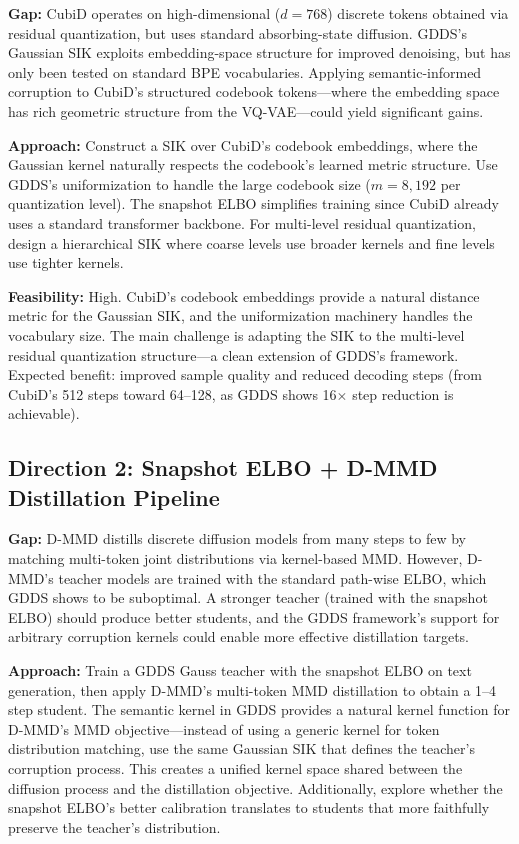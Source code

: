 \documentclass[11pt]{article}
\begin{document}
\textbf{Gap:} CubiD operates on high-dimensional ($d=768$) discrete tokens obtained via residual quantization, but uses standard absorbing-state diffusion. GDDS's Gaussian SIK exploits embedding-space structure for improved denoising, but has only been tested on standard BPE vocabularies. Applying semantic-informed corruption to CubiD's structured codebook tokens---where the embedding space has rich geometric structure from the VQ-VAE---could yield significant gains.

\textbf{Approach:} Construct a SIK over CubiD's codebook embeddings, where the Gaussian kernel naturally respects the codebook's learned metric structure. Use GDDS's uniformization to handle the large codebook size ($m = 8{,}192$ per quantization level). The snapshot ELBO simplifies training since CubiD already uses a standard transformer backbone. For multi-level residual quantization, design a hierarchical SIK where coarse levels use broader kernels and fine levels use tighter kernels.

\textbf{Feasibility:} High. CubiD's codebook embeddings provide a natural distance metric for the Gaussian SIK, and the uniformization machinery handles the vocabulary size. The main challenge is adapting the SIK to the multi-level residual quantization structure---a clean extension of GDDS's framework. Expected benefit: improved sample quality and reduced decoding steps (from CubiD's 512 steps toward 64--128, as GDDS shows 16$\times$ step reduction is achievable).

\subsection{Direction 2: Snapshot ELBO + D-MMD Distillation Pipeline}

\textbf{Gap:} D-MMD distills discrete diffusion models from many steps to few by matching multi-token joint distributions via kernel-based MMD. However, D-MMD's teacher models are trained with the standard path-wise ELBO, which GDDS shows to be suboptimal. A stronger teacher (trained with the snapshot ELBO) should produce better students, and the GDDS framework's support for arbitrary corruption kernels could enable more effective distillation targets.

\textbf{Approach:} Train a GDDS Gauss teacher with the snapshot ELBO on text generation, then apply D-MMD's multi-token MMD distillation to obtain a 1--4 step student. The semantic kernel in GDDS provides a natural kernel function for D-MMD's MMD objective---instead of using a generic kernel for token distribution matching, use the same Gaussian SIK that defines the teacher's corruption process. This creates a unified kernel space shared between the diffusion process and the distillation objective. Additionally, explore whether the snapshot ELBO's better calibration translates to students that more faithfully preserve the teacher's distribution.
\end{document}
